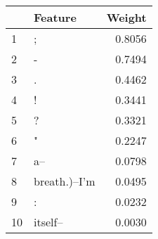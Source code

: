 \begin{tabular}{llr}
\toprule
{} &        Feature &  Weight \\
\midrule
1  &              ; &  0.8056 \\
2  &              - &  0.7494 \\
3  &              . &  0.4462 \\
4  &              ! &  0.3441 \\
5  &              ? &  0.3321 \\
6  &              " &  0.2247 \\
7  &            a-- &  0.0798 \\
8  &  breath.)--I'm &  0.0495 \\
9  &              : &  0.0232 \\
10 &       itself-- &  0.0030 \\
\bottomrule
\end{tabular}
